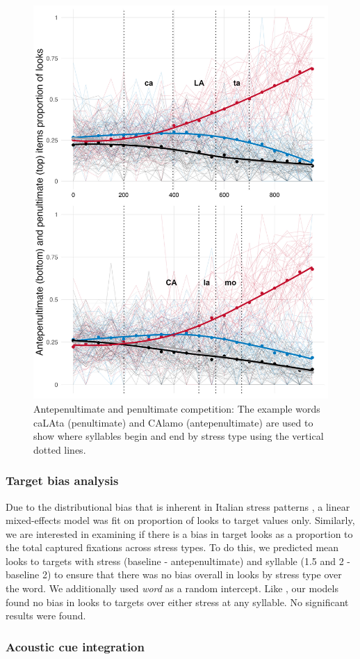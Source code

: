 \begin{figure}[H]
  \centering
  \includegraphics[width=0.6\linewidth]{visuals/pen_vs_anti_pen_id.jpeg} %
  \caption{Antepenultimate and penultimate competition: The example words caLAta (penultimate) and CAlamo (antepenultimate) are used to show where syllables begin and end by stress type using the vertical dotted lines.}
  \label{fig:raw_pen_vs_anti}
\end{figure}

\subsubsection{Target bias analysis}

Due to the distributional bias that is inherent in Italian stress patterns \cite{Sulpizio_McQueen_2012}, a linear mixed-effects model was fit on proportion of looks to target values only. Similarly, we are interested in examining if there is a bias in target looks as a proportion to the total captured fixations across stress types. To do this, we predicted mean looks to targets with stress (baseline - antepenultimate) and syllable (1.5 and 2 - baseline 2) to ensure that there was no bias overall in looks by stress type over the word. We additionally used \textit{word} as a random intercept. Like \cite{Sulpizio_McQueen_2012}, our models found no bias in looks to targets over either stress at any syllable. No significant results were found.   


\subsubsection{Acoustic cue integration}

